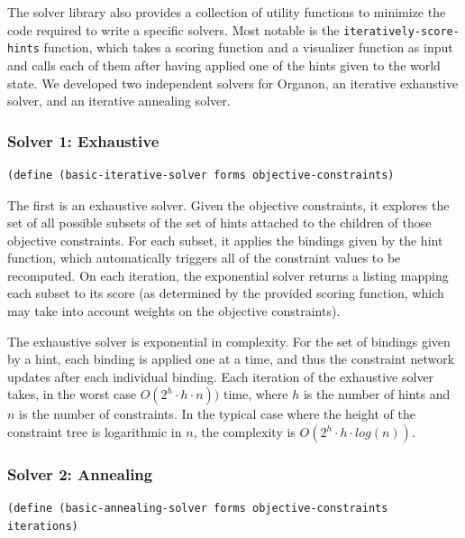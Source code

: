 \documentclass[12pt,a4paper]{article}
\begin{document}
The solver library also provides a collection of utility functions to minimize the code required to write a specific solvers. Most notable is the \texttt{iteratively-score-hints} function, which takes a scoring function and a visualizer function as input and calls each of them after having applied one of the hints given to the world state. We developed two independent solvers for Organon, an iterative exhaustive solver, and an iterative annealing solver.

\subsubsection{Solver 1: Exhaustive}
\begin{lstlisting}
(define (basic-iterative-solver forms objective-constraints)
\end{lstlisting}

The first is an exhaustive solver. Given the objective constraints, it explores the set of all possible subsets of the set of hints attached to the children of those objective constraints. For each subset, it applies the bindings given by the hint function, which automatically triggers all of the constraint values to be recomputed. On each iteration, the exponential solver returns a listing mapping each subset to its score (as determined by the provided scoring function, which may take into account weights on the objective constraints).

The exhaustive solver is exponential in complexity. For the set of bindings given by a hint, each binding is applied one at a time, and thus the constraint network updates after each individual binding. Each iteration of the exhaustive solver takes, in the worst case $O(2^{h} \cdot h \cdot n))$ time, where $h$ is the number of hints and $n$ is the number of constraints. In the typical case where the height of the constraint tree is logarithmic in $n$, the complexity is $O(2^{h} \cdot h \cdot log(n))$.
\newline

\subsubsection{Solver 2: Annealing}
\begin{lstlisting}
(define (basic-annealing-solver forms objective-constraints iterations)
\end{lstlisting}
\end{document}
